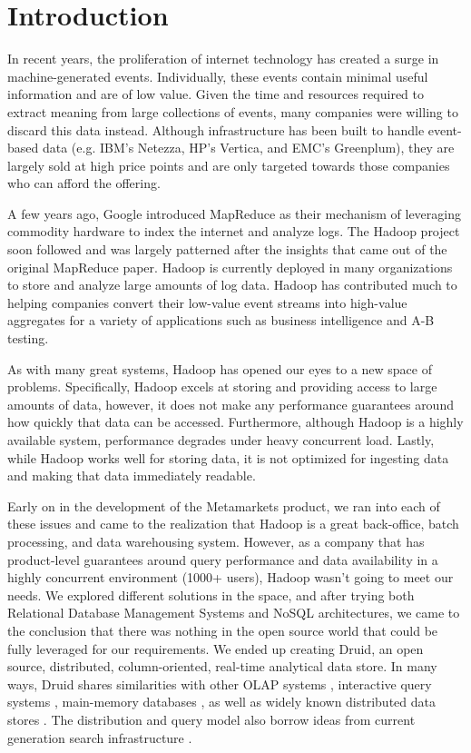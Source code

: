 \documentclass{sig-alternate-2013}
\begin{document}
\section{Introduction}
In recent years, the proliferation of internet technology has
created a surge in machine-generated events. Individually, these
events contain minimal useful information and are of low value. Given the
time and resources required to extract meaning from large collections of
events, many companies were willing to discard this data instead. Although
infrastructure has been built to handle event-based data (e.g. IBM's
Netezza\cite{singh2011introduction}, HP's Vertica\cite{bear2012vertica}, and EMC's
Greenplum\cite{miner2012unified}), they are largely sold at high price points
and are only targeted towards those companies who can afford the offering.

A few years ago, Google introduced MapReduce \cite{dean2008mapreduce} as their
mechanism of leveraging commodity hardware to index the internet and analyze
logs. The Hadoop \cite{shvachko2010hadoop} project soon followed and was
largely patterned after the insights that came out of the original MapReduce
paper. Hadoop is currently deployed in many organizations to store and analyze
large amounts of log data. Hadoop has contributed much to helping companies
convert their low-value event streams into high-value aggregates for a variety
of applications such as business intelligence and A-B testing.

As with many great systems, Hadoop has opened our eyes to a new space of
problems. Specifically, Hadoop excels at storing and providing access to large
amounts of data, however, it does not make any performance guarantees around
how quickly that data can be accessed. Furthermore, although Hadoop is a
highly available system, performance degrades under heavy concurrent load.
Lastly, while Hadoop works well for storing data, it is not optimized for
ingesting data and making that data immediately readable.

Early on in the development of the Metamarkets product, we ran into each of
these issues and came to the realization that Hadoop is a great back-office,
batch processing, and data warehousing system. However, as a company that has
product-level guarantees around query performance and data availability in a
highly concurrent environment (1000+ users), Hadoop wasn't going to meet our
needs. We explored different solutions in the space, and after
trying both Relational Database Management Systems and NoSQL architectures, we
came to the conclusion that there was nothing in the open source world that
could be fully leveraged for our requirements. We ended up creating Druid, an
open source, distributed, column-oriented, real-time analytical data store. In
many ways, Druid shares similarities with other OLAP systems
\cite{oehler2012ibm, schrader2009oracle, lachev2005applied},
interactive query systems \cite{melnik2010dremel}, main-memory databases
\cite{farber2012sap}, as well as widely known distributed data stores
\cite{chang2008bigtable, decandia2007dynamo, lakshman2010cassandra}. The
distribution and query model also borrow ideas from current generation search
infrastructure \cite{linkedin2013senseidb, apache2013solr,
banon2013elasticsearch}.
\end{document}

